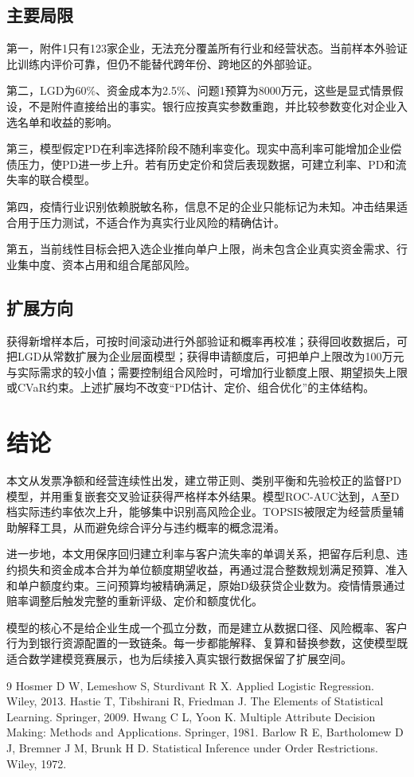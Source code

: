 \documentclass[12pt,a4paper]{ctexart}
\begin{document}
\subsection{主要局限}

第一，附件1只有123家企业，无法充分覆盖所有行业和经营状态。当前样本外验证比训练内评价可靠，但仍不能替代跨年份、跨地区的外部验证。

第二，LGD为60\%、资金成本为2.5\%、问题1预算为8000万元，这些是显式情景假设，不是附件直接给出的事实。银行应按真实参数重跑，并比较参数变化对企业入选名单和收益的影响。

第三，模型假定PD在利率选择阶段不随利率变化。现实中高利率可能增加企业偿债压力，使PD进一步上升。若有历史定价和贷后表现数据，可建立利率、PD和流失率的联合模型。

第四，疫情行业识别依赖脱敏名称，信息不足的企业只能标记为未知。冲击结果适合用于压力测试，不适合作为真实行业风险的精确估计。

第五，当前线性目标会把入选企业推向单户上限，尚未包含企业真实资金需求、行业集中度、资本占用和组合尾部风险。

\subsection{扩展方向}

获得新增样本后，可按时间滚动进行外部验证和概率再校准；获得回收数据后，可把LGD从常数扩展为企业层面模型；获得申请额度后，可把单户上限改为100万元与实际需求的较小值；需要控制组合风险时，可增加行业额度上限、期望损失上限或CVaR约束。上述扩展均不改变“PD估计、定价、组合优化”的主体结构。

\section{结论}

本文从发票净额和经营连续性出发，建立带正则、类别平衡和先验校正的监督PD模型，并用重复嵌套交叉验证获得严格样本外结果。模型ROC-AUC达到\ModelAUC，A至D档实际违约率依次上升，能够集中识别高风险企业。TOPSIS被限定为经营质量辅助解释工具，从而避免综合评分与违约概率的概念混淆。

进一步地，本文用保序回归建立利率与客户流失率的单调关系，把留存后利息、违约损失和资金成本合并为单位额度期望收益，再通过混合整数规划满足预算、准入和单户额度约束。三问预算均被精确满足，原始D级获贷企业数为\OriginalDLoanCount。疫情情景通过赔率调整后触发完整的重新评级、定价和额度优化。

模型的核心不是给企业生成一个孤立分数，而是建立从数据口径、风险概率、客户行为到银行资源配置的一致链条。每一步都能解释、复算和替换参数，这使模型既适合数学建模竞赛展示，也为后续接入真实银行数据保留了扩展空间。

\begin{thebibliography}{9}
\small
\setlength{\itemsep}{0pt}
\setlength{\parskip}{0pt}
 Hosmer D W, Lemeshow S, Sturdivant R X. Applied Logistic Regression. Wiley, 2013.
 Hastie T, Tibshirani R, Friedman J. The Elements of Statistical Learning. Springer, 2009.
 Hwang C L, Yoon K. Multiple Attribute Decision Making: Methods and Applications. Springer, 1981.
 Barlow R E, Bartholomew D J, Bremner J M, Brunk H D. Statistical Inference under Order Restrictions. Wiley, 1972.
\end{thebibliography}
\end{document}
